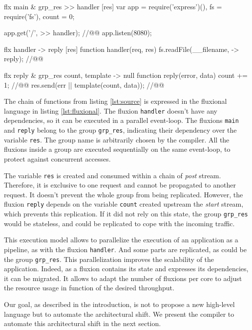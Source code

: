 \begin{code}[flx, caption={Example application expressed in the high-level fluxional language}, label={lst:fluxional}]
flx main & grp_res
>> handler [res]
  var app = require('express')(),
      fs = require('fs'),
      count = 0;

  app.get('/', >> handler); //@\label{lst:fluxional-streamtohandler}@
  app.listen(8080);

flx handler
-> reply [res]
  function handler(req, res) {
    fs.readFile(__filename, -> reply); //@\label{lst:fluxional-readfile}@
  }

flx reply & grp_res {count, template}
-> null
  function reply(error, data) {
    count += 1; //@\label{lst:fluxional-counter}@
    res.send(err || template(count, data)); //@\label{lst:fluxional-ressend}@
  }
\end{code}

The chain of functions from listing \ref{lst:source} is expressed in the fluxional language in listing \ref{lst:fluxional}.
The fluxion \texttt{handler} doesn't have any dependencies, so it can be executed in a parallel event-loop.
The fluxions \texttt{main} and \texttt{reply} belong to the group \texttt{grp\_res}, indicating their dependency over the variable \texttt{res}.
The group name is arbitrarily chosen by the compiler.
All the fluxions inside a group are executed sequentially on the same event-loop, to protect against concurrent accesses.

The variable \texttt{res} is created and consumed within a chain of \textit{post} stream.
Therefore, it is exclusive to one request and cannot be propagated to another request.
It doesn't prevent the whole group from being replicated.
However, the fluxion \texttt{reply} depends on the variable \texttt{count} created upstream the \textit{start} stream, which prevents this replication.
If it did not rely on this state, the group \texttt{grp\_res} would be stateless, and could be replicated to cope with the incoming traffic.

This execution model allows to parallelize the execution of an application as a pipeline, as with the fluxion \texttt{handler}.
And some parts are replicated, as could be the group \texttt{grp\_res}.
This parallelization improves the scalability of the application.
Indeed, as a fluxion contains its state and expresses its dependencies, it can be migrated.
It allows to adapt the number of fluxions per core to adjust the resource usage in function of the desired throughput.

Our goal, as described in the introduction, is not to propose a new high-level language but to automate the architectural shift.
We present the compiler to automate this architectural shift in the next section.